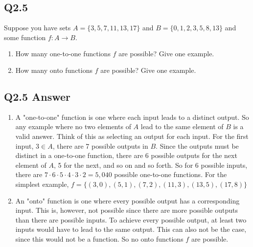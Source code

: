 \documentclass{article}
\begin{document}
\subsection*{Q2.5}
Suppose you have sets $A=\{3,5,7,11,13,17\}$ and $B=\{0,1,2,3,5,8,13\}$ and some function $f:A\rightarrow B$.
\begin{enumerate}[label=\alph*.]
\item How many one-to-one functions $f$ are possible? Give one example.
\item How many onto functions $f$ are possible? Give one example.
\end{enumerate}
\newpage
\subsection*{Q2.5 Answer}
\begin{enumerate}[label=\alph*.]
\item A "one-to-one" function is one where each input leads to a distinct output. So any example where no two elements of $A$ lead to the same element of $B$ is a valid answer. Think of this as selecting an output for each input. For the first input, $3\in A$, there are 7 possible outputs in $B$. Since the outputs must be distinct in a one-to-one function, there are 6 possible outputs for the next element of $A$, 5 for the next, and so on and so forth. So for 6 possible inputs, there are $7\cdot6\cdot5\cdot 4\cdot3\cdot2=5,040$ possible one-to-one functions. For the simplest example, $f=\{(3,0),(5,1),(7,2),(11,3),(13,5),(17,8)\}$
\item An "onto" function is one where every possible output has a corresponding input. This is, however, not possible since there are more possible outputs than there are possible inputs. To achieve every possible output, at least two inputs would have to lead to the same output. This can also not be the case, since this would not be a function. So no onto functions $f$ are possible.
\end{enumerate}
\newpage
\end{document}
